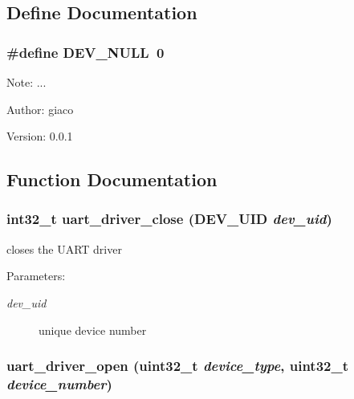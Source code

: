 \subsection{Define Documentation}
\hypertarget{group___u_a_r_t___d_r_i_v_e_r_g8a3ec48b54d63808ed4c386c320fed47}{
\subsubsection[{DEV\_\-NULL}]{\setlength{\rightskip}{0pt plus 5cm}\#define DEV\_\-NULL~0}}
\label{group___u_a_r_t___d_r_i_v_e_r_g8a3ec48b54d63808ed4c386c320fed47}


\begin{Desc}
\item[Note:]... \end{Desc}
\begin{Desc}
\item[Author:]giaco \end{Desc}
\begin{Desc}
\item[Version:]0.0.1 \end{Desc}


\subsection{Function Documentation}
\hypertarget{group___u_a_r_t___d_r_i_v_e_r_ga894da78cf2a50d46371a5db778827b6}{
\subsubsection[{uart\_\-driver\_\-close}]{\setlength{\rightskip}{0pt plus 5cm}int32\_\-t uart\_\-driver\_\-close ({\bf DEV\_\-UID} {\em dev\_\-uid})}}
\label{group___u_a_r_t___d_r_i_v_e_r_ga894da78cf2a50d46371a5db778827b6}


closes the UART driver \begin{Desc}
\item[Parameters:]
\begin{description}
\item[{\em dev\_\-uid}]unique device number \end{description}
\end{Desc}
\hypertarget{group___u_a_r_t___d_r_i_v_e_r_g21a2031520a7294468c5e6f74829a741}{
\subsubsection[{uart\_\-driver\_\-open}]{ uart\_\-driver\_\-open (uint32\_\-t {\em device\_\-type}, \/  uint32\_\-t {\em device\_\-number})}}
\label{group___u_a_r_t___d_r_i_v_e_r_g21a2031520a7294468c5e6f74829a741}


